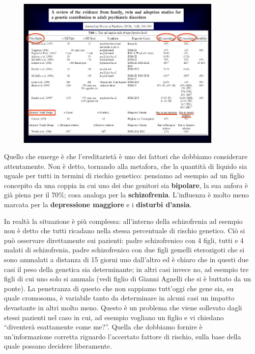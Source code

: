 \begin{figure}[!ht]
\centering
	\includegraphics[width=0.9\textwidth]{02/image3.jpeg}
\end{figure}

Quello che emerge è che l'ereditarietà è uno dei fattori che dobbiamo
considerare attentamente. Non è detto, tornando alla metafora, che la
quantità di liquido sia uguale per tutti in termini di rischio genetico:
pensiamo ad esempio ad un figlio concepito da una coppia in cui uno dei
due genitori sia \textbf{bipolare}, la sua anfora è già piena per il
70\%; cosa analoga per la \textbf{schizofrenia}. L'influenza è molto
meno marcata per la \textbf{depressione maggiore} e i \textbf{disturbi
d'ansia}.

In realtà la situazione è più complessa: all'interno della schizofrenia
ad esempio non è detto che tutti ricadano nella stessa percentuale di
rischio genetico. Ciò si può osservare direttamente sui pazienti: padre
schizofrenico con 4 figli, tutti e 4 malati di schizofrenia, padre
schizofrenico con due figli gemelli eterozigoti che si sono ammalati a
distanza di 15 giorni uno dall'altro ed è chiaro che in questi due casi
il peso della genetica sia determinante; in altri casi invece no, ad
esempio tre figli di cui uno solo si ammala (vedi figlio di Gianni
Agnelli che si è buttato da un ponte). La penetranza di questo che non
sappiamo tutt'oggi che gene sia, su quale cromosoma, è variabile tanto
da determinare in alcuni casi un impatto devastante in altri molto meno.
Questo è un problema che viene sollevato dagli stessi pazienti nel caso
in cui, ad esempio vogliano un figlio e vi chiedano ``diventerà
esattamente come me?''. Quella che dobbiamo fornire è un'informazione
corretta riguardo l'accertato fattore di rischio, sulla base della quale
possano decidere liberamente.

